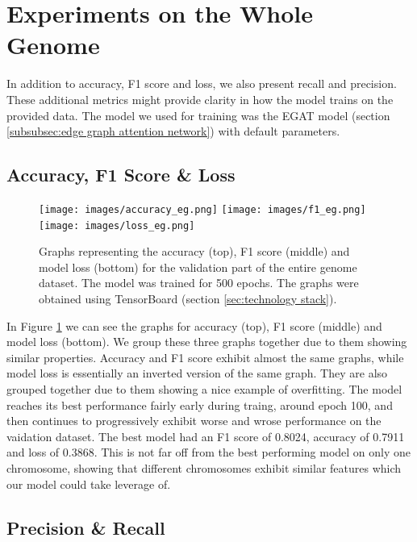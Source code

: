 \documentclass[times, utf8, diplomski, english]{fer_eng}
\begin{document}
\section{Experiments on the Whole Genome}
\label{sec:experiments on the whole genome}

In addition to accuracy, F1 score and loss, we also present recall and precision. These additional metrics might provide clarity in how the model trains on the provided data. The model we used for training was the EGAT model (section \ref{subsubsec:edge graph attention network}) with default parameters.

\subsection{Accuracy, F1 Score \& Loss}

\begin{figure}[h]
	\centering
	\texttt{[image: images/accuracy\_eg.png]}
	\texttt{[image: images/f1\_eg.png]}
	\texttt{[image: images/loss\_eg.png]}
	\caption[Accuracy,f1 score and loss graph]{Graphs representing the accuracy (top), F1 score (middle) and model loss (bottom) for the validation part of the entire genome dataset. The model was trained for 500 epochs. The graphs were obtained using TensorBoard (section \ref{sec:technology stack}).}
	\label{fig:accuracy, f1 score and loss}
\end{figure}

In Figure \ref{fig:accuracy, f1 score and loss} we can see the graphs for accuracy (top), F1 score (middle) and model loss (bottom). We group these three graphs together due to them showing similar properties. Accuracy and F1 score exhibit almost the same graphs, while model loss is essentially an inverted version of the same graph. They are also grouped together due to them showing a nice example of overfitting. The model reaches its best performance fairly early during traing, around epoch 100, and then continues to progressively exhibit worse and wrose performance on the vaidation dataset. The best model had an F1 score of 0.8024, accuracy of 0.7911 and loss of 0.3868. This is not far off from the best performing model on only one chromosome, showing that different chromosomes exhibit similar features which our model could take leverage of.

\subsection{Precision \& Recall}
\end{document}
